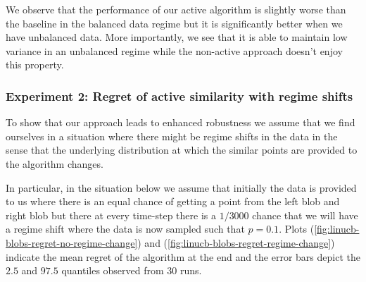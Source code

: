 \documentclass{article}
\begin{document}
We observe that the performance of our active algorithm is slightly worse than the baseline in the balanced data regime
but it is significantly better when we have unbalanced data. More importantly, we see that it is able to maintain low variance
in an unbalanced regime while the non-active approach doesn't enjoy this property.

\subsubsection{Experiment 2: Regret of active similarity with regime shifts}
To show that our approach leads to enhanced robustness we assume that we find ourselves in a situation
where there might be regime shifts in the data in the sense that the underlying distribution at which the similar points are provided
to the algorithm changes.

In particular, in the situation below we assume that initially the data is provided to us where there is an equal chance of getting a point
from the left blob and right blob but there at every time-step there is a $1/3000$ chance that
we will have a regime shift where the data is now sampled such that $p = 0.1$.
Plots (\ref{fig:linucb-blobs-regret-no-regime-change}) and (\ref{fig:linucb-blobs-regret-regime-change}) indicate the mean regret of the algorithm at the end
and the error bars depict the $2.5$ and $97.5$ quantiles observed from 30 runs.
\end{document}
